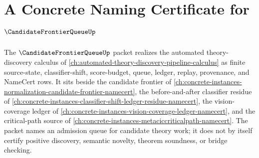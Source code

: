 \chapter{A Concrete Naming Certificate for $\CandidateFrontierQueueUp$}
\label{ch:concrete-instances-candidate-frontier-queue-namecert}

The $\CandidateFrontierQueueUp$ packet realizes the automated theory-discovery calculus of \autoref{ch:automated-theory-discovery-pipeline-calculus} as finite source-state, classifier-shift, score-budget, queue, ledger, replay, provenance, and NameCert rows. It sits beside the candidate frontier of \autoref{ch:concrete-instances-normalization-candidate-frontier-namecert}, the before-and-after classifier residue of \autoref{ch:concrete-instances-classifier-shift-ledger-residue-namecert}, the vision-coverage ledger of \autoref{ch:concrete-instances-vision-coverage-ledger-namecert}, and the critical-path source of \autoref{ch:concrete-instances-metaciccriticalpath-namecert}. The packet names an admission queue for candidate theory work; it does not by itself certify positive discovery, semantic novelty, theorem soundness, or bridge checking.

